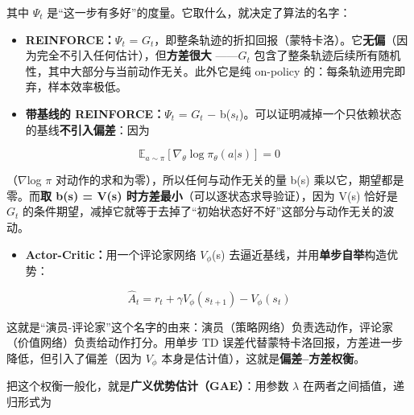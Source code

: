 \documentclass[11pt,a4paper]{ctexart}
\begin{document}
其中 ${\Psi}_{t}$ 是“这一步有多好”的度量。它取什么，就决定了算法的名字：\par

\begin{itemize}[leftmargin=1.6em,itemsep=0.15em,topsep=0.25em]

\item \textbf{REINFORCE：}${\Psi}_{t}$ = $G_{t}$，即整条轨迹的折扣回报（蒙特卡洛）。它\textbf{无偏}（因为完全不引入任何估计），但\textbf{方差很大} ——$G_{t}$ 包含了整条轨迹后续所有随机性，其中大部分与当前动作无关。此外它是纯 on-policy 的：每条轨迹用完即弃，样本效率极低。

\item \textbf{带基线的 REINFORCE：}${\Psi}_{t}$ = $G_{t}$ $-$ b($s_{t}$)。可以证明减掉一个只依赖状态的基线\textbf{不引入偏差}：因为

\end{itemize}

\begin{equation}\mathbb{E}_{a\sim\pi}\left[\nabla_\theta\log\pi_\theta(a|s)\right]=0\end{equation}

（$\nabla$log $\pi$ 对动作的求和为零），所以任何与动作无关的量 b(s) 乘以它，期望都是零。而\textbf{取 b(s) = V(s) 时方差最小}（可以逐状态求导验证），因为 V(s) 恰好是 $G_{t}$ 的条件期望，减掉它就等于去掉了“初始状态好不好”这部分与动作无关的波动。\par

\begin{itemize}[leftmargin=1.6em,itemsep=0.15em,topsep=0.25em]

\item \textbf{Actor-Critic：}用一个评论家网络 $V_{{\phi}}$(s) 去逼近基线，并用\textbf{单步自举}构造优势：

\end{itemize}

\begin{equation}\hat A_t=r_t+\gamma V_\phi(s_{t+1})-V_\phi(s_t)\end{equation}

这就是“演员-评论家”这个名字的由来：演员（策略网络）负责选动作，评论家（价值网络）负责给动作打分。用单步 TD 误差代替蒙特卡洛回报，方差进一步降低，但引入了偏差（因为 $V_{{\phi}}$ 本身是估计值），这就是\textbf{偏差–方差权衡}。\par

把这个权衡一般化，就是\textbf{广义优势估计（GAE）}：用参数 $\lambda$ 在两者之间插值，递归形式为\par
\end{document}

